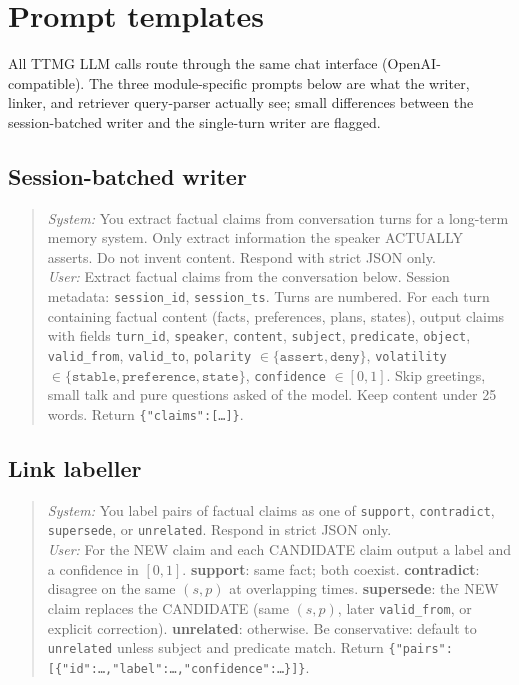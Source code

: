 \section{Prompt templates}
\label{app:prompts}

All TTMG LLM calls route through the same chat interface (OpenAI-compatible).
The three module-specific prompts below are what the writer, linker, and
retriever query-parser actually see; small differences between the
session-batched writer and the single-turn writer are flagged.

\subsection{Session-batched writer}
\label{app:writer_prompt}
\begin{quote}\small
\emph{System:} You extract factual claims from conversation turns for a
long-term memory system. Only extract information the speaker ACTUALLY
asserts. Do not invent content. Respond with strict JSON only.\\[2pt]
\emph{User:} Extract factual claims from the conversation below.
Session metadata: \texttt{session\_id}, \texttt{session\_ts}.
Turns are numbered. For each turn containing factual content (facts,
preferences, plans, states), output claims with fields \texttt{turn\_id},
\texttt{speaker}, \texttt{content}, \texttt{subject}, \texttt{predicate},
\texttt{object}, \texttt{valid\_from}, \texttt{valid\_to},
\texttt{polarity} $\in\{\texttt{assert},\texttt{deny}\}$,
\texttt{volatility} $\in\{\texttt{stable},\texttt{preference},
\texttt{state}\}$, \texttt{confidence} $\in [0,1]$. Skip greetings,
small talk and pure questions asked of the model. Keep content under 25
words. Return \texttt{\{"claims":[\ldots]\}}.
\end{quote}

\subsection{Link labeller}
\label{app:linker_prompt}
\begin{quote}\small
\emph{System:} You label pairs of factual claims as one of
\texttt{support}, \texttt{contradict}, \texttt{supersede}, or
\texttt{unrelated}. Respond in strict JSON only.\\[2pt]
\emph{User:} For the NEW claim and each CANDIDATE claim output a label
and a confidence in $[0,1]$.
\textbf{support}: same fact; both coexist. \textbf{contradict}:
disagree on the same $(s,p)$ at overlapping times. \textbf{supersede}:
the NEW claim replaces the CANDIDATE (same $(s,p)$, later
\texttt{valid\_from}, or explicit correction). \textbf{unrelated}:
otherwise. Be conservative: default to \texttt{unrelated} unless
subject and predicate match. Return
\texttt{\{"pairs":[\{"id":\ldots,"label":\ldots,"confidence":\ldots\}]\}}.
\end{quote}

